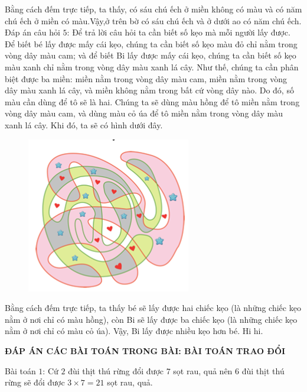 Bằng cách đếm trực tiếp, ta thấy, có sáu chú ếch ở miền không có màu và có năm chú ếch ở miền có màu.Vậy,ở trên bờ có sáu chú ếch và ở dưới ao có năm chú ếch. 
\vskip 0.1cm
Đáp án câu hỏi $5$:
\vskip 0.1cm
Để trả lời câu hỏi ta cần biết số kẹo mà mỗi người lấy được. Để biết bé lấy được mấy cái kẹo, chúng ta cần biết số kẹo màu đỏ chỉ nằm trong vòng dây màu cam; và để biết Bi lấy được mấy cái kẹo, chúng ta cần biết số kẹo màu xanh chỉ nằm trong vòng dây màu xanh lá cây. 
\vskip 0.1cm
Như thế, chúng ta cần phân biệt được ba miền: miền nằm trong vòng dây màu cam, miền nằm trong vòng dây màu xanh lá cây, và miền không nằm trong bất cứ vòng dây nào. Do đó, số màu cần dùng để tô sẽ là hai. Chúng ta sẽ dùng màu hồng để tô miền nằm trong vòng dây màu cam, và dùng màu cỏ úa để tô miền nằm trong vòng dây màu xanh lá cây. Khi đó, ta sẽ có hình dưới đây. 
\begin{figure}[H]
	\centering
	\vspace*{-5pt}
	\captionsetup{labelformat= empty, justification=centering}
	\includegraphics[width=0.4\linewidth]{2}
	\vspace*{-15pt}
\end{figure}
Bằng cách đếm trực tiếp, ta thấy bé sẽ lấy được hai chiếc kẹo (là những chiếc kẹo nằm ở nơi chỉ có màu hồng), còn Bi sẽ lấy được ba chiếc kẹo (là những chiếc kẹo nằm ở nơi chỉ có màu cỏ úa). Vậy, Bi lấy được nhiều kẹo hơn bé. Hi hi. 
\newpage
\begin{center}
	\textbf{ĐÁP ÁN CÁC BÀI TOÁN TRONG BÀI: BÀI TOÁN TRAO ĐỔI}
\end{center}
Bài toán $1$: Cứ $2$ đùi thịt thú rừng đổi được $7$ sọt rau, quả nên $6$ đùi thịt thú rừng sẽ đổi được $3\times 7=21$ sọt rau, quả.%

